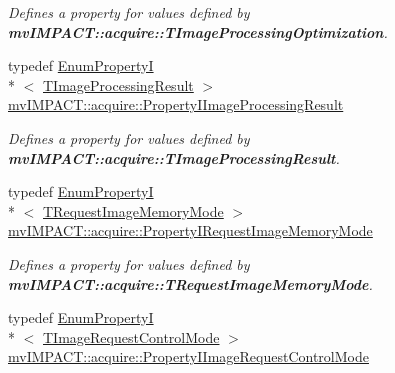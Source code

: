 \begin{DoxyCompactItemize}
\begin{DoxyCompactList}\small\item\em Defines a property for values defined by {\bfseries mv\+I\+M\+P\+A\+C\+T\+::acquire\+::\+T\+Image\+Processing\+Optimization}. \end{DoxyCompactList}\item 
\hypertarget{group___common_interface_gaebc9256b35be721414019bc375c2b5e9}{typedef \hyperlink{classmv_i_m_p_a_c_t_1_1acquire_1_1_enum_property_i}{Enum\+Property\+I}\\*
$<$ \hyperlink{group___common_interface_gac868128de70336bbecd2efbb80ee1309}{T\+Image\+Processing\+Result} $>$ \hyperlink{group___common_interface_gaebc9256b35be721414019bc375c2b5e9}{mv\+I\+M\+P\+A\+C\+T\+::acquire\+::\+Property\+I\+Image\+Processing\+Result}}\label{group___common_interface_gaebc9256b35be721414019bc375c2b5e9}

\begin{DoxyCompactList}\small\item\em Defines a property for values defined by {\bfseries mv\+I\+M\+P\+A\+C\+T\+::acquire\+::\+T\+Image\+Processing\+Result}. \end{DoxyCompactList}\item 
\hypertarget{group___common_interface_ga9fb22f658031cb16ba91a7446462670f}{typedef \hyperlink{classmv_i_m_p_a_c_t_1_1acquire_1_1_enum_property_i}{Enum\+Property\+I}\\*
$<$ \hyperlink{group___common_interface_ga3c4728ceba74a7bbd5ca93d32fa2e2f3}{T\+Request\+Image\+Memory\+Mode} $>$ \hyperlink{group___common_interface_ga9fb22f658031cb16ba91a7446462670f}{mv\+I\+M\+P\+A\+C\+T\+::acquire\+::\+Property\+I\+Request\+Image\+Memory\+Mode}}\label{group___common_interface_ga9fb22f658031cb16ba91a7446462670f}

\begin{DoxyCompactList}\small\item\em Defines a property for values defined by {\bfseries mv\+I\+M\+P\+A\+C\+T\+::acquire\+::\+T\+Request\+Image\+Memory\+Mode}. \end{DoxyCompactList}\item 
\hypertarget{group___common_interface_ga2dbb98d2580189d140e11115331f0416}{typedef \hyperlink{classmv_i_m_p_a_c_t_1_1acquire_1_1_enum_property_i}{Enum\+Property\+I}\\*
$<$ \hyperlink{group___common_interface_ga9e620f0553e3519d83067243240c4518}{T\+Image\+Request\+Control\+Mode} $>$ \hyperlink{group___common_interface_ga2dbb98d2580189d140e11115331f0416}{mv\+I\+M\+P\+A\+C\+T\+::acquire\+::\+Property\+I\+Image\+Request\+Control\+Mode}}\label{group___common_interface_ga2dbb98d2580189d140e11115331f0416}


\end{DoxyCompactItemize}
